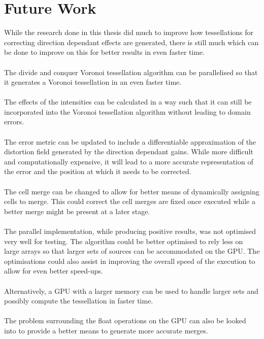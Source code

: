 \section{Future Work}
While the research done in this thesis did much to improve how tessellations for correcting direction dependant effects are generated, there is still much which can be done to improve on this for better results in even faster time.
\\
\\
The divide and conquer Voronoi tessellation algorithm can be parallelised so that it generates a Voronoi tessellation in an even faster time.
\\
\\
The effects of the intensities can be calculated in a way such that it can still be incorporated into the Voronoi tessellation algorithm without leading to domain errors.
\\
\\
The error metric can be updated to include a differentiable approximation of the distortion field generated by the direction dependant gains. While more difficult and computationally expensive, it will lead to a more accurate representation of the error and the position at which it needs to be corrected.
\\
\\
The cell merge can be changed to allow for better means of dynamically assigning cells to merge. This could correct the cell merges are fixed once executed while a better merge might be present at a later stage.
\\
\\
The parallel implementation, while producing positive results, was not optimised very well for testing. The algorithm could be better optimised to rely less on large arrays so that larger sets of sources can be accommodated on the GPU. The optimisations could also assist in improving the overall speed of the execution to allow for even better speed-ups.
\\
\\
Alternatively, a GPU with a larger memory can be used to handle larger sets and possibly compute the tessellation in faster time.
\\
\\
The problem surrounding the float operations on the GPU can also be looked into to provide a better means to generate more accurate merges.